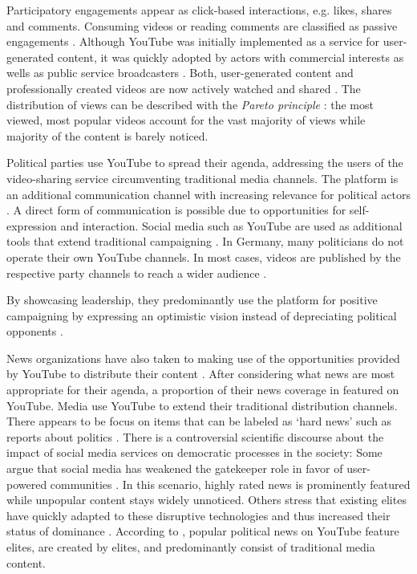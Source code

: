 \documentclass[sigchi, nonacm=true]{acmart}
\begin{document}
  Participatory engagements appear as click-based interactions, e.g. likes, shares and comments. Consuming videos or reading comments are classified as passive engagements \cite{khan_social_2017}. Although YouTube was initially implemented as a service for user-generated content, it was quickly adopted by actors with commercial interests \cite{castells_communication_2007} as wells as public service broadcasters \cite{iosifidis_public_2011}. Both, user-generated content and professionally created videos are now actively watched and shared \cite{xu_networked_2016}. The distribution of views can be described with the \textit{Pareto principle} \cite{cha_i_2007}: the most viewed, most popular videos account for the vast majority of views while majority of the content is barely noticed.

  Political parties use YouTube to spread their agenda, addressing the users of the video-sharing service circumventing traditional media channels. %
  The platform is an additional communication channel with increasing relevance for political actors \cite{johann_durchdachte_2018}. A direct form of communication is possible due to opportunities for self-expression and interaction. Social media such as YouTube are used as additional tools that extend traditional campaigning \cite{carlson_riding_2008, gibson_normalising_2015}. In Germany, many politicians do not operate their own YouTube channels. In most cases, videos are published by the respective party channels to reach a wider audience \cite{schweitzer_normalization_2011}.
  
  By showcasing leadership, they predominantly use the platform for positive campaigning by expressing an optimistic vision instead of depreciating political opponents \cite{sohal_content_2018}. 
 
  News organizations have also taken to making use of the opportunities provided by YouTube to distribute their content \cite{bruns_gatewatching:_2005}. After considering what news are most appropriate for their agenda, a proportion of their news coverage in featured on YouTube. Media use YouTube to extend their traditional distribution channels. There appears to be focus on items that can be labeled as ‘hard news’ such as reports about politics \cite{al_nashmi_promoting_2017}. There is a controversial scientific discourse about the impact of social media services on democratic processes in the society: Some argue that social media has weakened the gatekeeper role in favor of user-powered communities \cite{bruns_gatewatching:_2005}. In this scenario, highly rated news is prominently featured while unpopular content stays widely unnoticed. Others stress that existing elites have quickly adapted to these disruptive technologies and thus increased their status of dominance \cite{kperogi_cooperation_2011}. According to \cite{dylko_filtering_2012}, popular political news on YouTube feature elites, are created by elites, and predominantly consist of traditional media content.
\end{document}
